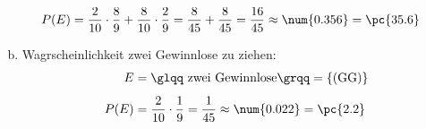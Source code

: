 \begin{exercise}
\begin{enumerate}[a)]
\begin{equation*}
\begin{split}
                P(E)&=\frac{2}{10}\cdot\frac{8}{9}
                     +\frac{8}{10}\cdot\frac{2}{9}
                =\frac{8}{45}+\frac{8}{45}
                =\frac{16}{45}
                \approx\num{0.356}
                =\pc{35.6}
              \end{split}
            \end{equation*}
      \item Wagrscheinlichkeit zwei Gewinnlose zu ziehen:
            \begin{equation*}
              \begin{split}
                E&=\text{\glqq zwei Gewinnlose\grqq}
                =\{(\text{GG})\}
                \\[1ex]
                P(E)&=\frac{2}{10}\cdot\frac{1}{9}
                =\frac{1}{45}
                \approx\num{0.022}
                =\pc{2.2}
              \end{split}
            \end{equation*}
    \end{enumerate}
  \fi
\end{exercise}
